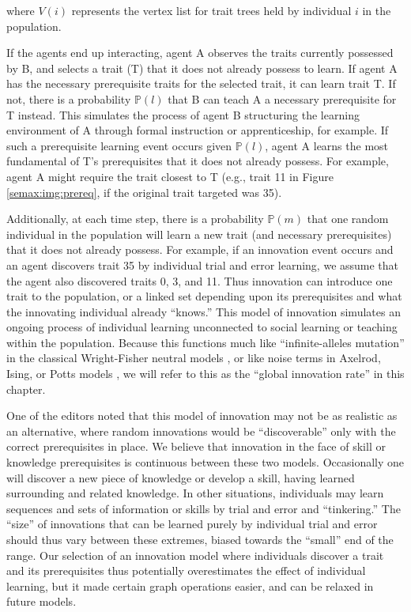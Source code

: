 where $V(i)$ represents the vertex list for trait trees held by
individual $i$ in the population.

If the agents end up interacting, agent A observes the traits currently
possessed by B, and selects a trait (T) that it does not already possess
to learn. If agent A has the necessary prerequisite traits for the
selected trait, it can learn trait T. If not, there is a probability
$\mathbb{P}(l)$ that B can teach A a necessary prerequisite for T
instead. This simulates the process of agent B structuring the learning
environment of A through formal instruction or apprenticeship, for
example. If such a prerequisite learning event occurs given
$\mathbb{P}(l)$, agent A learns the most fundamental of T's
prerequisites that it does not already possess. For example, agent A
might require the trait closest to T (e.g., trait 11 in Figure
\ref{semax:img:prereq}, if the original trait targeted was 35).

Additionally, at each time step, there is a probability $\mathbb{P}(m)$
that one random individual in the population will learn a new trait (and
necessary prerequisites) that it does not already possess. For example,
if an innovation event occurs and an agent discovers trait 35 by
individual trial and error learning, we assume that the agent also
discovered traits 0, 3, and 11. Thus innovation can introduce one trait
to the population, or a linked set depending upon its prerequisites and
what the innovating individual already ``knows.'' This model of
innovation simulates an ongoing process of individual learning
unconnected to social learning or teaching within the population.
Because this functions much like ``infinite-alleles mutation'' in the
classical Wright-Fisher neutral models \citep{Ewens2004}, or like noise
terms in Axelrod, Ising, or Potts models
\citep{castellano2009statistical}, we will refer to this as the ``global
innovation rate'' in this chapter.

One of the editors noted that this model of innovation may not be as
realistic as an alternative, where random innovations would be
``discoverable'' only with the correct prerequisites in place. We
believe that innovation in the face of skill or knowledge prerequisites
is continuous between these two models. Occasionally one will discover a
new piece of knowledge or develop a skill, having learned surrounding
and related knowledge. In other situations, individuals may learn
sequences and sets of information or skills by trial and error and
``tinkering.'' The ``size'' of innovations that can be learned purely by
individual trial and error should thus vary between these extremes,
biased towards the ``small'' end of the range. Our selection of an
innovation model where individuals discover a trait and its
prerequisites thus potentially overestimates the effect of individual
learning, but it made certain graph operations easier, and can be
relaxed in future models.


